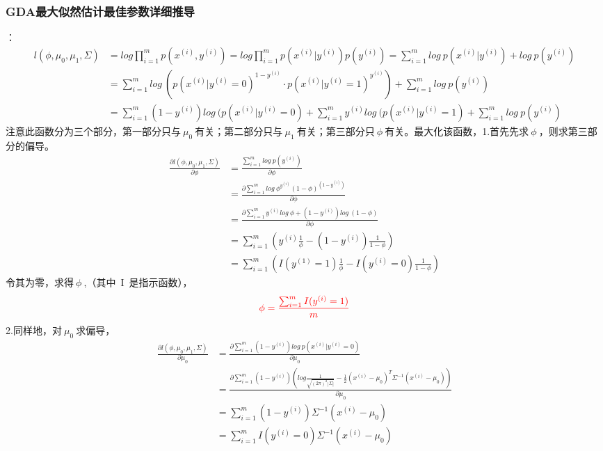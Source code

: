 \subsubsection{GDA最大似然估计最佳参数详细推导}
：
\begin{equation}\nonumber
\begin{split}
  l(\phi,\mu_0,\mu_1,\Sigma)&=log\prod_{i=1}^{m}p(x^{(i)},y^{(i)})=log\prod_{i=1}^{m}p(x^{(i)}|y^{(i)})p(y^{(i)})=\sum_{i=1}^{m}log~p(x^{(i)}|y^{(i)})+log~p(y^{(i)})\\
                            &=\sum_{i=1}^{m}log~(p(x^{(i)}|y^{(i)}=0)^{1-y^{(i)}}\cdot p(x^{(i)}|y^{(i)}=1)^{y^{(i)}})+\sum_{i=1}^{m}log~p(y^{(i)})\\
                            &=\sum_{i=1}^{m}(1-y^{(i)})log~(p(x^{(i)}|y^{(i)}=0)+\sum_{i=1}^{m}y^{(i)}log~(p(x^{(i)}|y^{(i)}=1)+\sum_{i=1}^{m}log~p(y^{(i)})
\end{split}
\end{equation}
注意此函数分为三个部分，第一部分只与$~\mu_0~$有关；第二部分只与$~\mu_1~$有关；第三部分只$~\phi~$有关。最大化该函数，1.首先先求$~\phi~$，则求第三部分的偏导。
\begin{equation}\nonumber
\begin{split}
  \frac{\partial l(\phi,\mu_0,\mu_1,\Sigma)}{\partial\phi }&=\frac{\sum_{i=1}^{m}log~p(y^{(i)})}{\partial\phi}\\
   &=\frac{\partial\sum_{i=1}^{m}log~\phi^{y^{(i)}}(1-\phi)^{(1-y^{(i)})}}{\partial\phi}\\
   &=\frac{\partial\sum_{i=1}^{m}y^{(i)}log~\phi+(1-y^{(i)})log~(1-\phi)}{\partial\phi}\\
   &=\sum_{i=1}^{m}(y^{(i)}\frac{1}{\phi}-(1-y^{(i)})\frac{1}{1-\phi})\\
   &=\sum_{i=1}^{m}(I(y^{(1)}=1)\frac{1}{\phi}-I(y^{(i)}=0)\frac{1}{1-\phi})
\end{split}
\end{equation}
令其为零，求得$~\phi~$,（其中~I~是指示函数），
\begin{equation}\nonumber
\begin{split}
  {\color{red}{\phi=\frac{\sum_{i=1}^{m}I(y^{(i)}=1)}{m}}}
\end{split}
\end{equation}
2.同样地，对$~\mu_0~$求偏导，
\begin{equation}\nonumber
\begin{split}
  \frac{\partial l(\phi,\mu_0,\mu_1,\Sigma)}{\partial\mu_0}&=\frac{\partial\sum_{i=1}^{m}(1-y^{(i)})log~p(x^{(i)}|y^{(i)}=0)}{\partial\mu_0}\\
    &=\frac{\partial\sum_{i=1}^{m}(1-y^{(i)})(log\frac{1}{\sqrt{(2\pi)^2|\Sigma|}}-\frac{1}{2}(x^{(i)}-\mu_0)^T\Sigma^{-1}(x^{(i)}-\mu_0))}{\partial\mu_0}\\
    &=\sum_{i=1}^{m}(1-y^{(i)})\Sigma^{-1}(x^{(i)}-\mu_0)\\
    &=\sum_{i=1}^{m}I(y^{(i)}=0)\Sigma^{-1}(x^{(i)}-\mu_0)\\
\end{split}
\end{equation}
